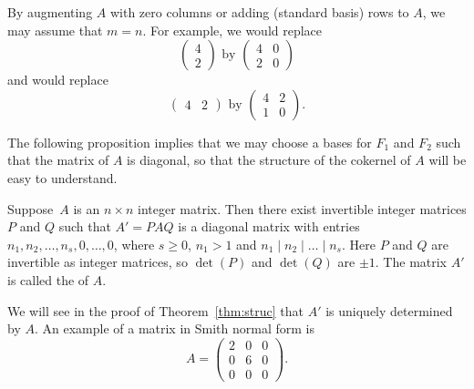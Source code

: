 By augmenting $A$ with zero columns or adding (standard basis) rows to
$A$, we may assume that $m = n$.    For example, we would replace
$$
  \left(\begin{matrix} 4 \\
       2 \end{matrix}\right)
\text{ by }
  \left(\begin{matrix} 4 & 0\\
       2 & 0 \end{matrix}\right)
$$
and would replace 
$$
  \left(\begin{matrix} 4 & 2 \end{matrix}\right)
\text{ by }
  \left(\begin{matrix} 4 & 2\\
       1 & 0 \end{matrix}\right).
$$

The following proposition implies that we may choose a bases for $F_1$
and $F_2$ such that the matrix of $A$ is diagonal, so that the
structure of the cokernel of $A$ will be easy to understand.

\begin{proposition}\label{prop:smith}
Suppose~$A$ is an $n\times n$ integer matrix.  Then there exist
invertible integer matrices $P$ and $Q$ such that $A'=PAQ$ is a
diagonal matrix with entries $n_1, n_2,\ldots, n_s,0,\ldots,0$, where
$s\geq 0$, $n_1>1$ and $n_1\mid n_2 \mid{} \ldots \mid{} n_s$.  
Here $P$ and $Q$ are invertible as integer matrices, so $\det(P)$
and $\det(Q)$ are $\pm 1$.
The matrix $A'$ is called
the  of $A$.
\end{proposition}
We will see in the proof of Theorem~\ref{thm:struc} that
$A'$ is uniquely determined by $A$.
An example of a matrix in Smith normal form is 
$$
A=\left(
        \begin{matrix}2&0&0\\0&6&0\\0&0&0
        \end{matrix}\right).
$$

